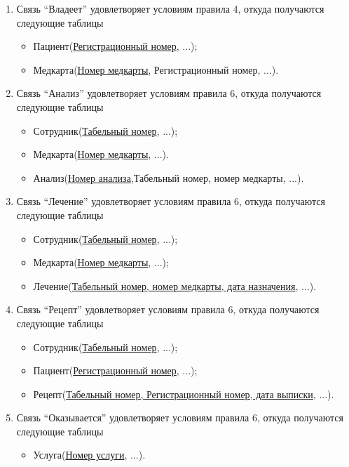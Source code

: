 \documentclass[14pt,a4paper,russian]{extreport}
\begin{document}
\begin{enumerate}[noitemsep]
    \item Связь ``Владеет'' удовлетворяет условиям правила 4, откуда получаются следующие таблицы
    \begin{itemize}[noitemsep]
            \item Пациент(\underline{Регистрационный номер}, ...);
            \item Медкарта(\underline{Номер медкарты}, Регистрационный номер, ...).
        \end{itemize}
    \item Связь ``Анализ'' удовлетворяет условиям правила 6, откуда получаются следующие
        таблицы
	\begin{itemize}[noitemsep]
            \item Сотрудник(\underline{Табельный номер}, ...);
            \item Медкарта(\underline{Номер медкарты}, ...).
            \item Анализ(\underline{Номер анализа},Табельный номер, номер медкарты, ...).
        \end{itemize}
    \item Связь ``Лечение'' удовлетворяет условиям правила 6, откуда получаются следующие таблицы
    \begin{itemize}[noitemsep]
            \item Сотрудник(\underline{Табельный номер}, ...);
            \item Медкарта(\underline{Номер медкарты}, ...);
            \item Лечение(\underline{Табельный номер, номер медкарты, дата назначения}, ...).
        \end{itemize}
    \item Связь ``Рецепт'' удовлетворяет условиям правила 6, откуда получаются следующие таблицы
    \begin{itemize}[noitemsep]
            \item Сотрудник(\underline{Табельный номер}, ...);
            \item Пациент(\underline{Регистрационный номер}, ...);
            \item Рецепт(\underline{Табельный номер, Регистрационный номер, дата выписки}, ...).
        \end{itemize}
    \item Связь ``Оказывается'' удовлетворяет условиям правила 6, откуда получаются следующие
        таблицы
	\begin{itemize}[noitemsep]
            \item Услуга(\underline{Номер услуги}, ...).

\end{itemize}
\end{enumerate}
\end{document}
